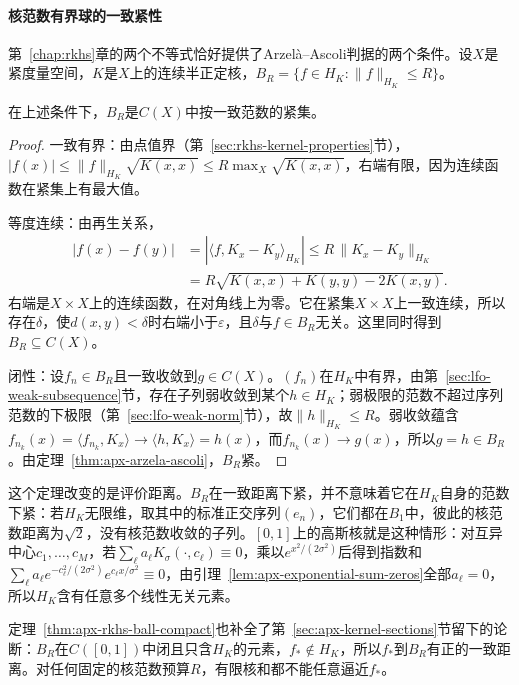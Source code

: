 \paragraph{核范数有界球的一致紧性}

第~\ref{chap:rkhs}章的两个不等式恰好提供了Arzelà--Ascoli判据的两个条件。设$X$是紧度量空间，$K$是$X$上的连续半正定核，$B_R=\{f\in H_K:\|f\|_{H_K}\le R\}$。

\begin{theorem}[核范数球在连续函数空间中的紧性]
\label{thm:apx-rkhs-ball-compact}
在上述条件下，$B_R$是$C(X)$中按一致范数的紧集。
\end{theorem}

\begin{proof}
一致有界：由点值界（第~\ref{sec:rkhs-kernel-properties}节），$|f(x)|\le\|f\|_{H_K}\sqrt{K(x,x)}\le R\max_{X}\sqrt{K(x,x)}$，右端有限，因为连续函数在紧集上有最大值。

等度连续：由再生关系，
\[
  \begin{aligned}
  |f(x)-f(y)|&=|\langle f,K_x-K_y\rangle_{H_K}|\le R\,\|K_x-K_y\|_{H_K}\\
  &=R\sqrt{K(x,x)+K(y,y)-2K(x,y)} .
  \end{aligned}
\]
右端是$X\times X$上的连续函数，在对角线上为零。它在紧集$X\times X$上一致连续，所以存在$\delta$，使$d(x,y)<\delta$时右端小于$\varepsilon$，且$\delta$与$f\in B_R$无关。这里同时得到$B_R\subseteq C(X)$。

闭性：设$f_n\in B_R$且一致收敛到$g\in C(X)$。$(f_n)$在$H_K$中有界，由第~\ref{sec:lfo-weak-subsequence}节，存在子列弱收敛到某个$h\in H_K$；弱极限的范数不超过序列范数的下极限（第~\ref{sec:lfo-weak-norm}节），故$\|h\|_{H_K}\le R$。弱收敛蕴含$f_{n_k}(x)=\langle f_{n_k},K_x\rangle\to\langle h,K_x\rangle=h(x)$，而$f_{n_k}(x)\to g(x)$，所以$g=h\in B_R$。由定理~\ref{thm:apx-arzela-ascoli}，$B_R$紧。
\end{proof}

这个定理改变的是评价距离。$B_R$在一致距离下紧，并不意味着它在$H_K$自身的范数下紧：若$H_K$无限维，取其中的标准正交序列$(e_n)$，它们都在$B_1$中，彼此的核范数距离为$\sqrt2$，没有核范数收敛的子列。$[0,1]$上的高斯核就是这种情形：对互异中心$c_1,\ldots,c_M$，若$\sum_\ell a_\ell K_\sigma(\cdot,c_\ell)\equiv0$，乘以$e^{x^2/(2\sigma^2)}$后得到指数和$\sum_\ell a_\ell e^{-c_\ell^2/(2\sigma^2)}e^{c_\ell x/\sigma^2}\equiv0$，由引理~\ref{lem:apx-exponential-sum-zeros}全部$a_\ell=0$，所以$H_K$含有任意多个线性无关元素。

定理~\ref{thm:apx-rkhs-ball-compact}也补全了第~\ref{sec:apx-kernel-sections}节留下的论断：$B_R$在$C([0,1])$中闭且只含$H_K$的元素，$f_*\notin H_K$，所以$f_*$到$B_R$有正的一致距离。对任何固定的核范数预算$R$，有限核和都不能任意逼近$f_*$。


